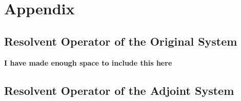 \section*{Appendix}

\subsection{Resolvent Operator of the Original System}

\textbf{I have made enough space to include this here}

\subsection{Resolvent Operator of the Adjoint System}
